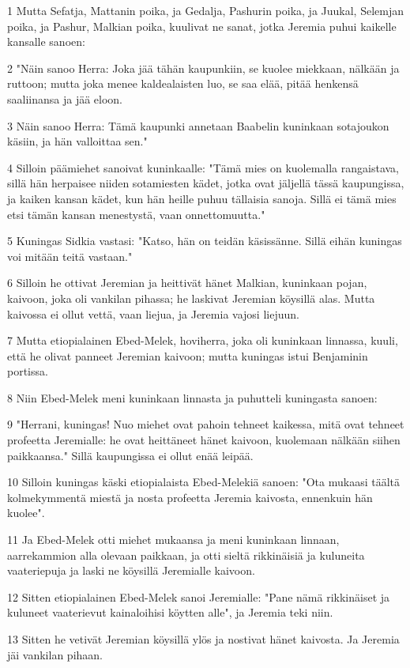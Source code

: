 \par 1 Mutta Sefatja, Mattanin poika, ja Gedalja, Pashurin poika, ja Juukal, Selemjan poika, ja Pashur, Malkian poika, kuulivat ne sanat, jotka Jeremia puhui kaikelle kansalle sanoen:
\par 2 "Näin sanoo Herra: Joka jää tähän kaupunkiin, se kuolee miekkaan, nälkään ja ruttoon; mutta joka menee kaldealaisten luo, se saa elää, pitää henkensä saaliinansa ja jää eloon.
\par 3 Näin sanoo Herra: Tämä kaupunki annetaan Baabelin kuninkaan sotajoukon käsiin, ja hän valloittaa sen."
\par 4 Silloin päämiehet sanoivat kuninkaalle: "Tämä mies on kuolemalla rangaistava, sillä hän herpaisee niiden sotamiesten kädet, jotka ovat jäljellä tässä kaupungissa, ja kaiken kansan kädet, kun hän heille puhuu tällaisia sanoja. Sillä ei tämä mies etsi tämän kansan menestystä, vaan onnettomuutta."
\par 5 Kuningas Sidkia vastasi: "Katso, hän on teidän käsissänne. Sillä eihän kuningas voi mitään teitä vastaan."
\par 6 Silloin he ottivat Jeremian ja heittivät hänet Malkian, kuninkaan pojan, kaivoon, joka oli vankilan pihassa; he laskivat Jeremian köysillä alas. Mutta kaivossa ei ollut vettä, vaan liejua, ja Jeremia vajosi liejuun.
\par 7 Mutta etiopialainen Ebed-Melek, hoviherra, joka oli kuninkaan linnassa, kuuli, että he olivat panneet Jeremian kaivoon; mutta kuningas istui Benjaminin portissa.
\par 8 Niin Ebed-Melek meni kuninkaan linnasta ja puhutteli kuningasta sanoen:
\par 9 "Herrani, kuningas! Nuo miehet ovat pahoin tehneet kaikessa, mitä ovat tehneet profeetta Jeremialle: he ovat heittäneet hänet kaivoon, kuolemaan nälkään siihen paikkaansa." Sillä kaupungissa ei ollut enää leipää.
\par 10 Silloin kuningas käski etiopialaista Ebed-Melekiä sanoen: "Ota mukaasi täältä kolmekymmentä miestä ja nosta profeetta Jeremia kaivosta, ennenkuin hän kuolee".
\par 11 Ja Ebed-Melek otti miehet mukaansa ja meni kuninkaan linnaan, aarrekammion alla olevaan paikkaan, ja otti sieltä rikkinäisiä ja kuluneita vaateriepuja ja laski ne köysillä Jeremialle kaivoon.
\par 12 Sitten etiopialainen Ebed-Melek sanoi Jeremialle: "Pane nämä rikkinäiset ja kuluneet vaaterievut kainaloihisi köytten alle", ja Jeremia teki niin.
\par 13 Sitten he vetivät Jeremian köysillä ylös ja nostivat hänet kaivosta. Ja Jeremia jäi vankilan pihaan.

